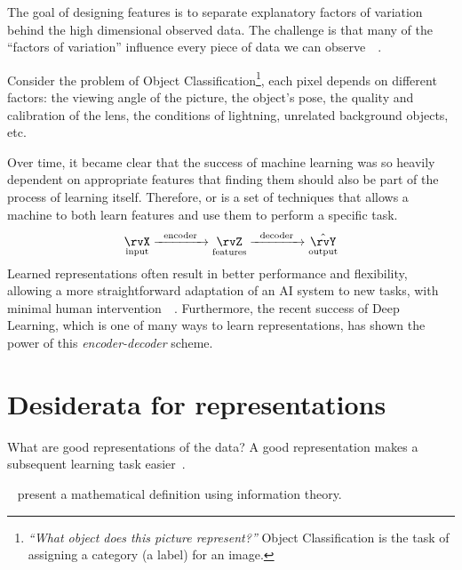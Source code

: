 The goal of designing features is to separate explanatory factors of variation behind the high dimensional observed data. The challenge is that many of the ``factors of variation'' influence every piece of data we can observe~~\cite{goodfellow:2016}.

Consider the problem of Object Classification\footnote{\emph{``What object does this picture represent?''} Object Classification is the task of assigning a category (a label) for an image.}, each pixel depends on different factors: the viewing angle of the picture, the object's pose, the quality and calibration of the lens, the conditions of lightning, unrelated background objects, etc.

Over time, it became clear that the success of machine learning was so heavily dependent on appropriate features that finding them should also be part of the process of learning itself. Therefore,  or  is a set of techniques that allows a machine to both learn features and use them to perform a specific task.
\begin{align*}
  \underset{\text{input}}{\rvX} \xrightarrow{\hspace*{0.2cm}\text{encoder}\hspace*{0.2cm}}\underset{\text{features}}{\rvZ} \xrightarrow{\hspace*{0.2cm}\text{decoder}\hspace*{0.2cm}}\underset{\text{output}}{\hat{\rvY}}
\end{align*}
Learned representations often result in better performance and flexibility, allowing a more straightforward adaptation of an AI system to new tasks, with minimal human intervention~~\cite{goodfellow:2016}. Furthermore, the recent success of Deep Learning, which is one of many ways to learn representations, has shown the power of this \emph{encoder-decoder} scheme.

\section{Desiderata for representations}\label{sec:desiderata}
What are good representations of the data? A good representation makes a subsequent learning task easier~\cite{goodfellow:2016}.

\citeauthor{achille:2017emergence}~\cite{achille:2017emergence} present a mathematical definition using information theory.

